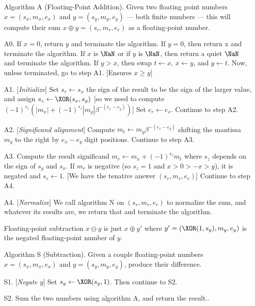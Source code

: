 \algbegin Algorithm A (Floating-Point Addition). \label{alg:float-addition}Given two floating
point numbers $x=(s_{x},m_{x},e_{x})$ and $y=(s_{y},m_{y},e_{y})$ ---
both finite numbers --- this
will compute their sum $x\oplus y = (s_{r}, m_{r}, e_{r})$ as a
floating-point number.

\algstep A0.
If $x = 0$, return $y$ and terminate the algorithm.
If $y=0$, then return x and terminate the algorithm.
If $x$ is $\NaN$ or if $y$ is $\NaN$, then return a quiet $\NaN$
and terminate the algorithm.
If $y > x$, then swap $t\gets x$, $x\gets y$, and $y\gets t$.
Now, unless terminated, go to step A1. [Ensures $x\geq y$]

\algstep A1. [{\it Initialize\/}]
Set $s_{r}\gets s_{x}$ the sign of the
result to be the sign of the larger value, and assign $s_{z} \gets \XOR(s_{x},s_{y})$
[so we need to compute $(-1)^{s_{x}}(|m_{x}| + (-1)^{s_{z}}|m_{y}|\beta^{-(e_{x}-e_{y})})$]
Set $e_{r}\gets e_{x}$. Continue to step A2.

\algstep A2. [{\it Significand alignment\/}] Compute $m_{t}\gets m_{y}\beta^{-(e_{x}-e_{y})}$
shifting the mantissa $m_{y}$ to the right by $e_{x}-e_{y}$ digit
positions. Continue to step A3.

\algstep A3. Compute the result significand $m_{r}\gets m_{x} + (-1)^{s_{z}}m_{t}$
where $s_{z}$ depends on the sign of $s_{y}$ and $s_{x}$. If $m_{r}$
is negative (so $s_{z}=1$ and $x>0>-x>y$), it is negated and $s_{r}\gets 1$.
[We have the tenative answer $(s_{r}, m_{r}, e_{r})$] Continue to step A4.

\algstep A4. [{\it Normalize\/}] We call algorithm N on $(s_{r}, m_{r}, e_{r})$
to normalize the sum, and whatever its results are, we return that and
terminate the algorithm.\quad\slug

\begin{rmk}[Subtraction]
  Floating-point subtraction $x\ominus y$ is just $x\oplus y'$ where
  $y' = (\XOR(1,s_{y}),m_{y},e_{y})$ is the negated floating-point
  number of $y$.
\end{rmk}

\algbegin Algorithm S (Subtraction). \label{alg:float-subtraction}Given a couple floating-point
numbers $x=(s_{x},m_{x},e_{x})$ and $y=(s_{y}, m_{y}, e_{y})$, produce
their difference.

\algstep S1. [{\it Negate $y$\/}] Set $s_{y}\gets\XOR(s_{y},1)$. Then
continue to S2.

\algstep S2. Sum the two numbers using algorithm A, and return the result.\quad\slug.

